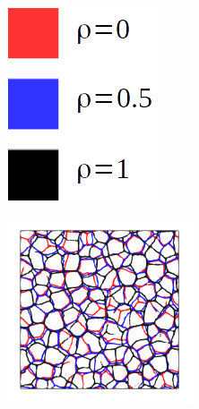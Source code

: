 
\begin{figure}[!htbp]
    \centering
    \begin{subfigure}[b]{0.07\textwidth}
        \includegraphics[width=\textwidth]{colorbar/rho.png}
        \vspace{0.2in}
    \end{subfigure}
    \begin{subfigure}[b]{0.35\textwidth}
        \includegraphics[width=0.6\textwidth]{past/figures/psic_constant.png}

\end{subfigure}
\end{figure}

